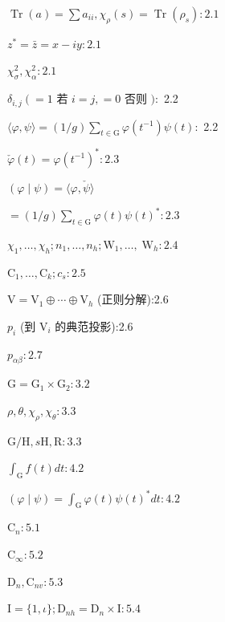 \documentclass[10pt]{article}
\begin{document}
\(\operatorname{Tr}\left( a\right)  = \sum {a}_{ii},{\chi }_{\rho }\left( s\right)  = \operatorname{Tr}\left( {\rho }_{s}\right)  : {2.1}\)

\({z}^{ * } = \bar{z} = x - {iy} : {2.1}\)

\({\chi }_{\sigma }^{2},{\chi }_{\alpha }^{2} : {2.1}\)

\({\delta }_{i,j}\left(  = \right. 1\) 若 \(i = j, = 0\) 否则 \() :\) 2.2

\(\langle \varphi ,\psi \rangle  = \left( {1/g}\right) \mathop{\sum }\limits_{{t \in  \mathrm{G}}}\varphi \left( {t}^{-1}\right) \psi \left( t\right)  :\) 2.2

\(\check{\varphi }\left( t\right)  = \varphi {\left( {t}^{-1}\right) }^{ * } : {2.3}\)

\(\left( {\varphi  \mid  \psi }\right)  = \langle \varphi ,\check{\psi }\rangle\)

\(= \left( {1/g}\right) \mathop{\sum }\limits_{{t \in  \mathrm{G}}}\varphi \left( t\right) \psi {\left( t\right) }^{ * } : {2.3}\)

\({\chi }_{1},\ldots ,{\chi }_{h};{n}_{1},\ldots ,{n}_{h};{\mathrm{W}}_{1},\ldots , \; {\mathrm{W}}_{h} : {2.4}\)

\({\mathrm{C}}_{1},\ldots ,{\mathrm{C}}_{k};{c}_{s} : {2.5}\)

\(\mathrm{V} = {\mathrm{V}}_{1} \oplus  \cdots  \oplus  {\mathrm{V}}_{h}\) (正则分解):2.6

\({p}_{i}\) (到 \({\mathrm{V}}_{i}\) 的典范投影):2.6

\({p}_{\alpha \beta } : {2.7}\)

\(\mathrm{G} = {\mathrm{G}}_{1} \times  {\mathrm{G}}_{2} : {3.2}\)

\(\rho ,\theta ,{\chi }_{\rho },{\chi }_{\theta } : {3.3}\)

\(\mathrm{G}/\mathrm{H},s\mathrm{H},\mathrm{R} : {3.3}\)

\({\int }_{\mathrm{G}}f\left( t\right) {dt} : {4.2}\)

\(\left( {\varphi  \mid  \psi }\right)  = {\int }_{\mathrm{G}}\varphi \left( t\right) \psi {\left( t\right) }^{ * }{dt} : {4.2}\)

\({\mathrm{C}}_{n} : {5.1}\)

\({\mathrm{C}}_{\infty } : {5.2}\)

\({\mathrm{D}}_{n},{\mathrm{C}}_{nv} : {5.3}\)

\(\mathrm{I} = \{ 1,\iota \} ;{\mathrm{D}}_{nh} = {\mathrm{D}}_{n} \times  \mathrm{I} : {5.4}\)
\end{document}
